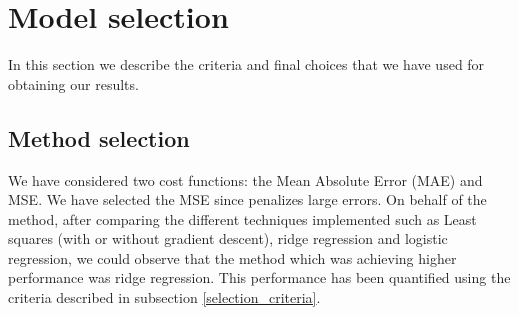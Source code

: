 \documentclass[10pt,conference,compsocconf]{IEEEtran}
\begin{document}
\section{Model selection}
\label{sec:Model selection}
In this section we describe the criteria and final choices that we have used for obtaining our results.

\subsection{Method selection}
\label{selection}
 \begin{enumerate}
    We have considered  two cost functions: the Mean Absolute Error (MAE) and MSE. We have selected the MSE since penalizes large errors.
    On behalf of the method, after comparing the different techniques implemented such as Least squares (with or without gradient descent), ridge regression and logistic regression, we could observe that the method which was achieving higher performance was ridge regression. This performance has been quantified using the criteria described in subsection \ref{selection_criteria}.  
    
 \end{enumerate}
 
\end{document}
